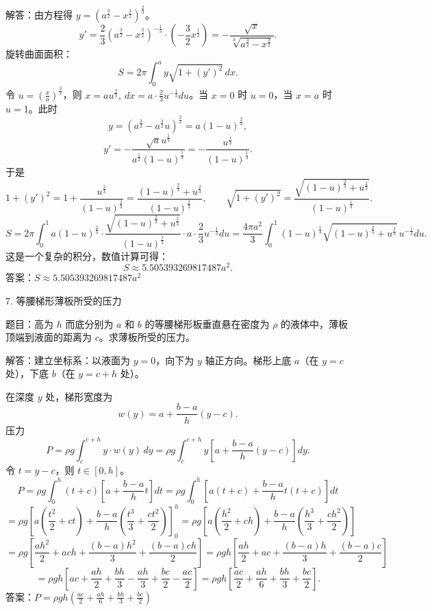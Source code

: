 解答：由方程得 \(y=\left(a^{\frac{3}{2}}-x^{\frac{3}{2}}\right)^{\frac{2}{3}}\)。
\[ y'=\frac{2}{3}\left(a^{\frac{3}{2}}-x^{\frac{3}{2}}\right)^{-\frac{1}{3}}\cdot\left(-\frac{3}{2}x^{\frac{1}{2}}\right)=-\frac{\sqrt{x}}{\sqrt[3]{a^{\frac{3}{2}}-x^{\frac{3}{2}}}}. \]
旋转曲面面积：
\[ S=2\pi\int_{0}^{a}y\sqrt{1+(y')^{2}}\,dx. \]
令 \(u=\left(\frac{x}{a}\right)^{\frac{3}{2}}\)，则 \(x=au^{\frac{2}{3}},\ dx=a\cdot\frac{2}{3}u^{-\frac{1}{3}}du\)。当 \(x=0\) 时 \(u=0\)，当 \(x=a\) 时 \(u=1\)。此时
\[ y=\left(a^{\frac{3}{2}}-a^{\frac{3}{2}}u\right)^{\frac{2}{3}}=a(1-u)^{\frac{2}{3}}, \]
\[ y'=-\frac{\sqrt{a}u^{\frac{1}{3}}}{a^{\frac{1}{2}}(1-u)^{\frac{1}{3}}}=-\frac{u^{\frac{1}{3}}}{(1-u)^{\frac{1}{3}}}. \]
于是
\[ 1+(y')^{2}=1+\frac{u^{\frac{2}{3}}}{(1-u)^{\frac{2}{3}}}=\frac{(1-u)^{\frac{2}{3}}+u^{\frac{2}{3}}}{(1-u)^{\frac{2}{3}}},\qquad \sqrt{1+(y')^{2}}=\frac{\sqrt{(1-u)^{\frac{2}{3}}+u^{\frac{2}{3}}}}{(1-u)^{\frac{1}{3}}}. \]
\[ S=2\pi\int_{0}^{1}a(1-u)^{\frac{2}{3}}\cdot\frac{\sqrt{(1-u)^{\frac{2}{3}}+u^{\frac{2}{3}}}}{(1-u)^{\frac{1}{3}}}\cdot a\cdot\frac{2}{3}u^{-\frac{1}{3}}du=\frac{4\pi a^{2}}{3}\int_{0}^{1}(1-u)^{\frac{1}{3}}\sqrt{(1-u)^{\frac{2}{3}}+u^{\frac{2}{3}}}\,u^{-\frac{1}{3}}du. \]
这是一个复杂的积分，数值计算可得：
\[ S\approx5.505393269817487a^{2}. \]
答案：\(S\approx5.505393269817487a^{2}\)

7. 等腰梯形薄板所受的压力

题目：高为 \(h\) 而底分别为 \(a\) 和 \(b\) 的等腰梯形板垂直悬在密度为 \(\rho\) 的液体中，薄板顶端到液面的距离为 \(c\)。求薄板所受的压力。

解答：建立坐标系：以液面为 \(y=0\)，向下为 \(y\) 轴正方向。梯形上底 \(a\)（在 \(y=c\) 处），下底 \(b\)（在 \(y=c+h\) 处）。

在深度 \(y\) 处，梯形宽度为
\[ w(y)=a+\frac{b-a}{h}(y-c). \]
压力
\[ P=\rho g\int_{c}^{c+h}y\cdot w(y)\,dy=\rho g\int_{c}^{c+h}y\left[a+\frac{b-a}{h}(y-c)\right]dy. \]
令 \(t=y-c\)，则 \(t\in[0,h]\)。
\[ P=\rho g\int_{0}^{h}(t+c)\left[a+\frac{b-a}{h}t\right]dt=\rho g\int_{0}^{h}\left[a(t+c)+\frac{b-a}{h}t(t+c)\right]dt \]
\[ =\rho g\left[a\left(\frac{t^{2}}{2}+ct\right)+\frac{b-a}{h}\left(\frac{t^{3}}{3}+\frac{ct^{2}}{2}\right)\right]_{0}^{h}=\rho g\left[a\left(\frac{h^{2}}{2}+ch\right)+\frac{b-a}{h}\left(\frac{h^{3}}{3}+\frac{ch^{2}}{2}\right)\right] \]
\[ =\rho g\left[\frac{ah^{2}}{2}+ach+\frac{(b-a)h^{2}}{3}+\frac{(b-a)ch}{2}\right]=\rho gh\left[\frac{ah}{2}+ac+\frac{(b-a)h}{3}+\frac{(b-a)c}{2}\right] \]
\[ =\rho gh\left[ac+\frac{ah}{2}+\frac{bh}{3}-\frac{ah}{3}+\frac{bc}{2}-\frac{ac}{2}\right]=\rho gh\left[\frac{ac}{2}+\frac{ah}{6}+\frac{bh}{3}+\frac{bc}{2}\right]. \]
答案：\(P=\rho gh\left(\frac{ac}{2}+\frac{ah}{6}+\frac{bh}{3}+\frac{bc}{2}\right)\)


